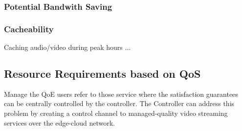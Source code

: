 \subsubsection{Potential Bandwith Saving}



\subsubsection{Cacheability}


Caching audio/video during peak hours ...


\subsection{Resource Requirements based on QoS}

Manage the QoE users refer to those service where the satisfaction guarantees can be centrally controlled by the controller. The Controller can address this problem by creating a control channel to managed-quality video streaming services over the edge-cloud network.
